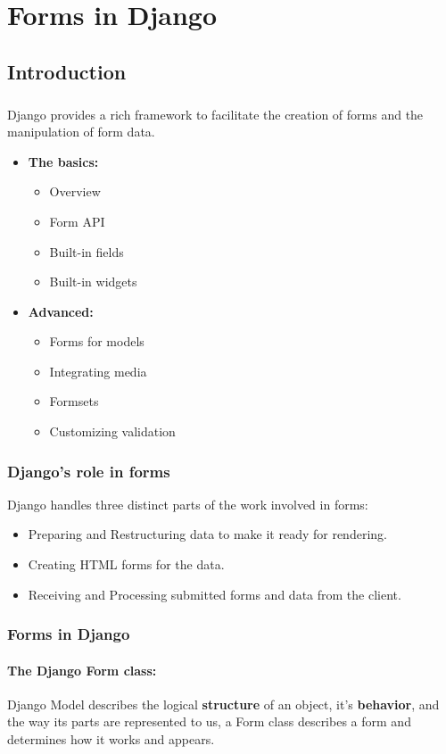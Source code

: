 \chapter{Forms in Django}
\section{Introduction}
\paragraph{} Django provides a rich framework to facilitate the creation of forms and the manipulation of form data.
\begin{itemize}
	\item \textbf{The basics:} 
	\begin{itemize}
		\item Overview 
		\item Form API 
		\item Built-in fields 
		\item Built-in widgets
	\end{itemize}
   \item \textbf{Advanced:}
   \begin{itemize}
   	\item Forms for models 
   	\item Integrating media  
   	\item Formsets 
   	\item Customizing validation
   \end{itemize}
\end{itemize}
\subsection{Django's role in forms}
Django handles three distinct parts of the work involved in forms:\\
\begin{itemize}
	\item Preparing and Restructuring data to make it ready for rendering.
	\item Creating HTML forms for the data.
	\item Receiving and Processing submitted forms and data from the client.
\end{itemize}
\subsection{Forms in Django}
\subsubsection{ The Django \textbf{Form} class:}
Django Model describes the logical \textbf{structure} of an object, it's \textbf{behavior}, and the way its parts are represented to us, a Form class describes a form and determines how it works and appears.\\

